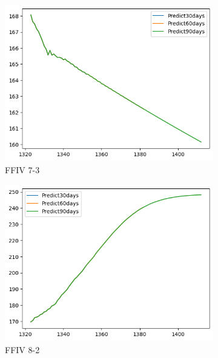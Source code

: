 \documentclass{ieeeojies}
\begin{document}
\begin{figure}[H]
    \centering
    \begin{subfigure}[b]{0.33\linewidth}
        \centering
        \includegraphics[width=\linewidth]{RNN Plot/RNN_FFIV_7_3_90.png}
        \caption{FFIV 7-3}
        \label{fig:ffiv-7-3}
    \end{subfigure}%
    \hfill
    \begin{subfigure}[b]{0.33\linewidth}
        \centering
        \includegraphics[width=\linewidth]{RNN Plot/RNN_FFIV_8_2_90.png}
        \caption{FFIV 8-2}
        \label{fig:ffiv-8-2}
    \end{subfigure}%
    \hfill
    \begin{subfigure}[b]{0.33\linewidth}

\end{subfigure}
\end{figure}
\end{document}
